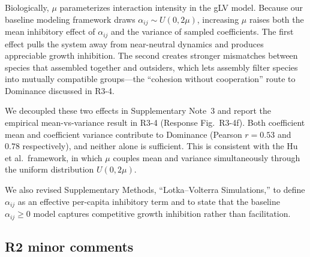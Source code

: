 
\responselabel
Biologically, $\mu$ parameterizes interaction intensity in the gLV model. Because our baseline modeling framework draws $\alpha_{ij} \sim U(0, 2\mu)$, increasing $\mu$ raises both the mean inhibitory effect of $\alpha_{ij}$ and the variance of sampled coefficients. The first effect pulls the system away from near-neutral dynamics and produces appreciable growth inhibition. The second creates stronger mismatches between species that assembled together and outsiders, which lets assembly filter species into mutually compatible groups---the ``cohesion without cooperation'' route to Dominance discussed in R3-4.

We decoupled these two effects in Supplementary Note~3 and report the empirical mean-vs-variance result in R3-4 (Response Fig.~R3-4f). Both coefficient mean and coefficient variance contribute to Dominance (Pearson $r=0.53$ and $0.78$ respectively), and neither alone is sufficient. This is consistent with the Hu et al.\ framework, in which $\mu$ couples mean and variance simultaneously through the uniform distribution $U(0, 2\mu)$.

We also revised Supplementary Methods, ``Lotka--Volterra Simulations,'' to define $\alpha_{ij}$ as an effective per-capita inhibitory term and to state that the baseline $\alpha_{ij}\geq 0$ model captures competitive growth inhibition rather than facilitation.



\subsection*{R2 minor comments}


